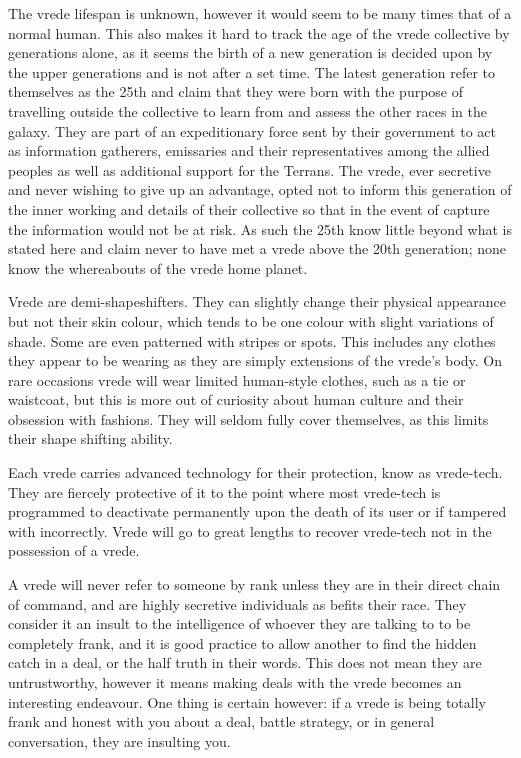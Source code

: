 The vrede lifespan is unknown, however it would seem to be many times that of a normal human. This also makes it hard to track the age of the vrede collective by generations alone, as it seems the birth of a new generation is decided upon by the upper generations and is not after a set time. The latest generation refer to themselves as the 25th and claim that they were born with the purpose of travelling outside the collective to learn from and assess the other races in the galaxy. They are part of an expeditionary force sent by their government to act as information gatherers, emissaries and their representatives among the allied peoples as well as additional support for the Terrans. The vrede, ever secretive and never wishing to give up an advantage, opted not to inform this generation of the inner working and details of their collective so that in the event of capture the information would not be at risk. As such the 25th know little beyond what is stated here and claim never to have met a vrede above the 20th generation; none know the whereabouts of the vrede home planet.

Vrede are demi-shapeshifters. They can slightly change their physical appearance but not their skin colour, which tends to be one colour with slight variations of shade. Some are even patterned with stripes or spots. This includes any clothes they appear to be wearing as they are simply extensions of the vrede's body. On rare occasions vrede will wear limited human-style clothes, such as a tie or waistcoat, but this is more out of curiosity about human culture and their obsession with fashions. They will seldom fully cover themselves, as this limits their shape shifting ability.

Each vrede carries advanced technology for their protection, know as vrede-tech. They are fiercely protective of it to the point where most vrede-tech is programmed to deactivate permanently upon the death of its user or if tampered with incorrectly. Vrede will go to great lengths to recover vrede-tech not in the possession of a vrede.

A vrede will never refer to someone by rank unless they are in their direct chain of command, and are highly secretive individuals as befits their race. They consider it an insult to the intelligence of whoever they are talking to to be completely frank, and it is good practice to allow another to find the hidden catch in a deal, or the half truth in their words. This does not mean they are untrustworthy, however it means making deals with the vrede becomes an interesting endeavour. One thing is certain however: if a vrede is being totally frank and honest with you about a deal, battle strategy, or in general conversation, they are insulting you.


